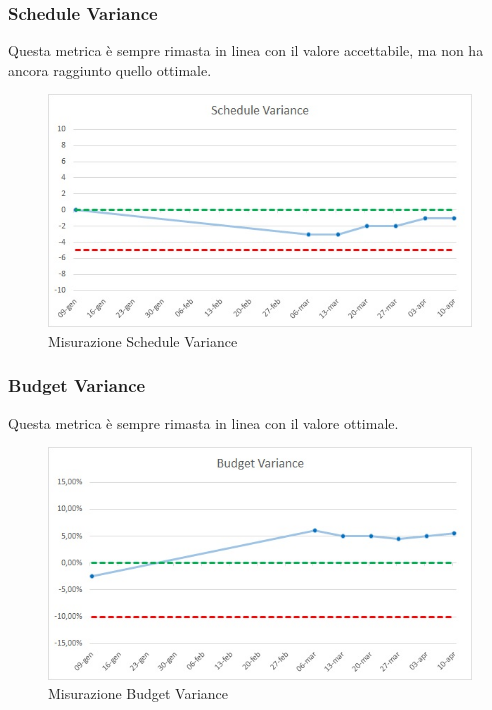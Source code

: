 \subsubsection{Schedule Variance}
Questa metrica è sempre rimasta in linea con il valore accettabile, ma non ha ancora raggiunto quello ottimale.
\begin{figure} [H]
	\centering
	\includegraphics[scale=1]{Img/schedulev}
	\caption{Misurazione Schedule Variance}\label{}
\end{figure}

\subsubsection{Budget Variance}
Questa metrica è sempre rimasta in linea con il valore ottimale.
\begin{figure} [H]
	\centering
	\includegraphics[scale=1]{Img/budgetv}
	\caption{Misurazione Budget Variance}\label{}
\end{figure}

